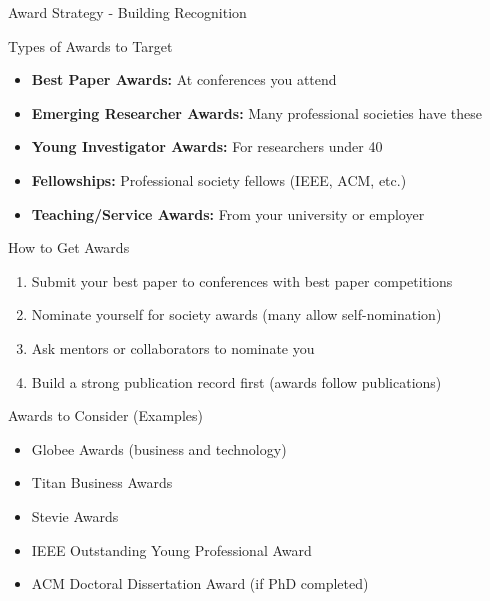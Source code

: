 \documentclass[11pt]{beamer}
\begin{document}
				\begin{frame}{Award Strategy - Building Recognition}
					\scriptsize
					\begin{block}{Types of Awards to Target}
						\begin{itemize}
							\item \textbf{Best Paper Awards:} At conferences you attend
							\item \textbf{Emerging Researcher Awards:} Many professional societies have these
							\item \textbf{Young Investigator Awards:} For researchers under 40
							\item \textbf{Fellowships:} Professional society fellows (IEEE, ACM, etc.)
							\item \textbf{Teaching/Service Awards:} From your university or employer
						\end{itemize}
					\end{block}
					\begin{block}{How to Get Awards}
						\begin{enumerate}
							\item Submit your best paper to conferences with best paper competitions
							\item Nominate yourself for society awards (many allow self-nomination)
							\item Ask mentors or collaborators to nominate you
							\item Build a strong publication record first (awards follow publications)
						\end{enumerate}
					\end{block}
					\begin{block}{Awards to Consider (Examples)}
						\begin{itemize}
							\item Globee Awards (business and technology)
							\item Titan Business Awards
							\item Stevie Awards
							\item IEEE Outstanding Young Professional Award
							\item ACM Doctoral Dissertation Award (if PhD completed)
						\end{itemize}
					\end{block}
				\end{frame}
				
\end{document}

